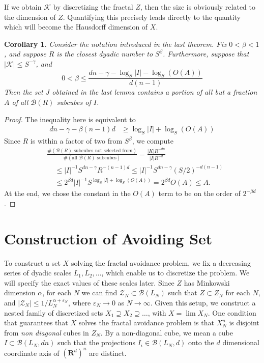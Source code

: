 \documentclass{article}
\theoremstyle{plain}
\newtheorem*{corollary}{Corollary}
\theoremstyle{plain}
\begin{document}
\begin{multicols}{2}
If we obtain $\mathcal{K}$ by discretizing the fractal $Z$, then the size is obviously related to the dimension of $Z$. Quantifying this precisely leads directly to the quantity which will become the Hausdorff dimension of $X$.

\begin{corollary}
	Consider the notation introduced in the last theorem. Fix $0 < \beta < 1$, and suppose $R$ is the closest dyadic number to $S^\beta$. Furthermore, suppose that $|\mathcal{K}| \leq S^{-\gamma}$, and
	\[ 0 < \beta \leq \frac{dn - \gamma - \log_S |I| - \log_S(O(A))}{d(n-1)} \] 
	Then the set $J$ obtained in the last lemma contains a portion of all but a fraction $A$ of all $\mathcal{B}(R)$ subcubes of $I$.
\end{corollary}
\begin{proof}
	The inequality here is equivalent to
	\begin{align*}
		dn - \gamma - \beta(n-1)d &\geq \log_S |I| + \log_S(O(A))
	\end{align*}
	Since $R$ is within a factor of two from $S^\beta$, we compute
	\begin{align*}
		&\frac{\# (\text{$\mathcal{B}(R)$ subcubes not selected from})}{\# (\text{all $\mathcal{B}(R)$ subcubes})} = \frac{|K| R^{-dn}}{|I|R^{-d}}\\
		&\ \ \ \ \ \leq |I|^{-1} S^{dn - \gamma} R^{-(n-1)d} \leq |I|^{-1} S^{dn - \gamma} (S/2)^{-d(n-1)}\\
		&\ \ \ \ \ \leq 2^{\beta d}|I|^{-1} S^{\log_S|I| + \log_S(O(A))} = 2^{\beta d} O(A) \leq A.
	\end{align*}
	At the end, we chose the constant in the $O(A)$ term to be on the order of $2^{-\beta d}$.
\end{proof}

\section{Construction of Avoiding Set}

To construct a set $X$ solving the fractal avoidance problem, we fix a decreasing series of dyadic scales $L_1, L_2, \dots$, which enable us to discretize the problem. We will specify the exact values of these scales later. Since $Z$ has Minkowski dimension $\alpha$, for each $N$ we can find $\mathcal{Z}_N \subset \mathcal{B}(L_N)$ such that $Z \subset Z_N$ for each $N$, and $|\mathcal{Z}_N| \leq 1/L_N^{\alpha + \varepsilon_N}$, where $\varepsilon_N \to 0$ as $N \to \infty$. Given this setup, we construct a nested family of discretized sets $X_1 \supseteq X_2 \supseteq \dots$, with $X = \lim X_N$. One condition that guarantees that $X$ solves the fractal avoidance problem is that $X_N^n$ is disjoint from {\it non diagonal} cubes in $Z_N$. By a non-diagonal cube, we mean a cube $I \subset \mathcal{B}(L_N,dn)$ such that the projections $I_i \in \mathcal{B}(L_N,d)$ onto the $d$ dimensional coordinate axis of $(\mathbf{R}^d)^n$ are distinct.


\end{multicols}
\end{document}
